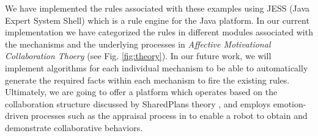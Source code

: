 We have implemented the rules associated with these examples using JESS (Java
Expert System Shell) which is a rule engine for the Java platform. In our
current implementation we have categorized the rules in different modules
associated with the mechanisms and the underlying processes in \textit{Affective
Motivational Collaboration Thoery} (see Fig. \ref{fig:theory}). In our future
work, we will implement algorithms for each individual mechanism to be able to
automatically generate the required facts within each mechanism to fire the
existing rules. Ultimately, we are going to offer a platform which operates
based on the collaboration structure discussed by SharedPlans theory
\cite{grosz:discourse-structure}, and employs emotion-driven processes such as
the appraisal process in \cite{marsella:ema-process-model} to enable a robot to
obtain and demonstrate collaborative behaviors.




%
%





